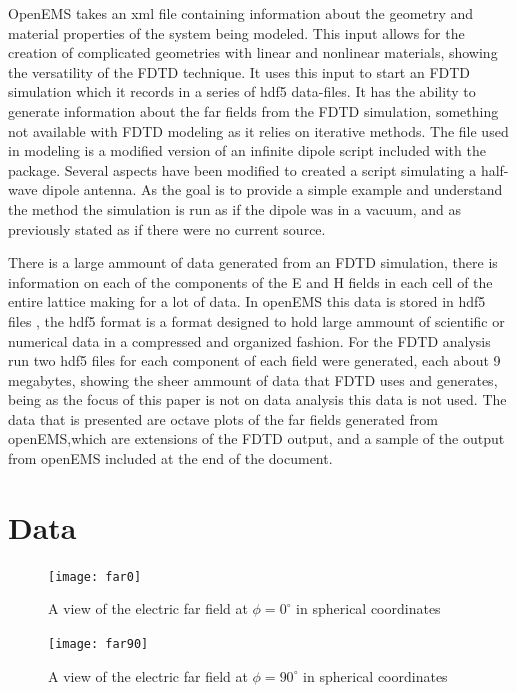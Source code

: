 \documentclass[twocolumn]{article}
\begin{document}
OpenEMS takes an xml file containing information about the geometry and material properties of the
system being modeled. This input allows for the creation of complicated geometries with linear and
nonlinear materials, showing the versatility of the FDTD technique. It uses this input to start an
FDTD simulation which it records in a series of hdf5 data-files. It has the ability to generate
information about the far fields from the FDTD simulation, something not available with FDTD
modeling as it relies on iterative methods. The file used in modeling is a modified version of an
infinite dipole script included with the package. Several aspects have been modified to created a
script simulating a half-wave dipole antenna. As the goal is to provide a simple example and
understand the method the simulation is run as if the dipole was in a vacuum, and as previously
stated as if there were no current source.

There is a large ammount of data generated from an FDTD simulation, there is information on each of
the components of the E and H fields in each cell of the entire lattice making for a lot of data. In
openEMS this data is stored in hdf5 files , the hdf5 format is a format designed to hold large
ammount of scientific or numerical data in a compressed and organized fashion\cite{hdf5}. For the
FDTD analysis run two hdf5 files for each component of each field were generated, each about 9
megabytes, showing the sheer ammount of data that FDTD uses and generates, being as the focus of this
paper is not on data analysis this data is not used. The data that is presented are octave plots of
the far fields generated from openEMS,which are extensions of the FDTD output, and a sample of the
output from openEMS included at the end of the document.
\section{Data}
\begin{figure}[p,h!]
\vspace{-20pt}
\texttt{[image: far0]}
\caption{A view of the electric far field at $\phi=0^{\circ}$ in spherical coordinates}
\end{figure}

\begin{figure}[p,h]
\texttt{[image: far90]}
\caption{A view of the electric far field at $\phi=90^{\circ}$ in spherical coordinates}
\end{figure}
\end{document}
